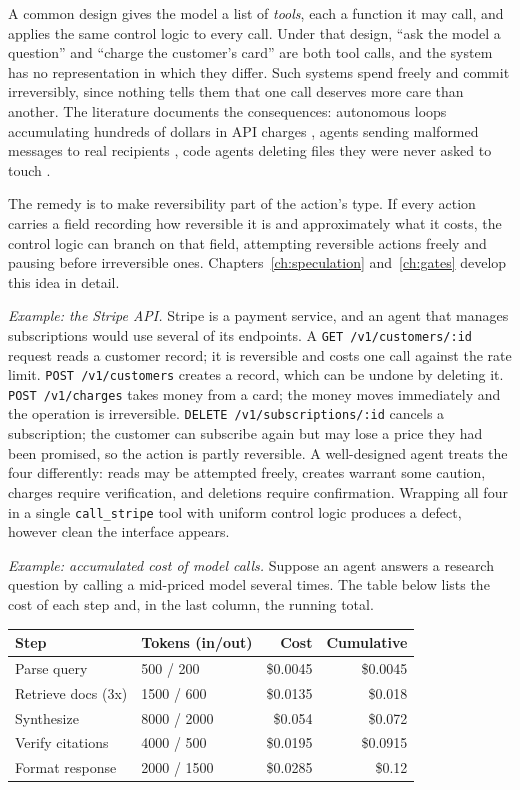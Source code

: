 \documentclass[11pt]{book}
\begin{document}
A common design gives the model a list of \textit{tools}, each a function it may call, and applies the same control logic to every call. Under that design, ``ask the model a question'' and ``charge the customer's card'' are both tool calls, and the system has no representation in which they differ. Such systems spend freely and commit irreversibly, since nothing tells them that one call deserves more care than another. The literature documents the consequences: autonomous loops accumulating hundreds of dollars in API charges \cite{yang2023autogpt}, agents sending malformed messages to real recipients \cite{liu2023agentbench}, code agents deleting files they were never asked to touch \cite{jimenez2024swebench}.

The remedy is to make reversibility part of the action's type. If every action carries a field recording how reversible it is and approximately what it costs, the control logic can branch on that field, attempting reversible actions freely and pausing before irreversible ones. Chapters~\ref{ch:speculation} and~\ref{ch:gates} develop this idea in detail.

\textit{Example: the Stripe API.} Stripe is a payment service, and an agent that manages subscriptions would use several of its endpoints. A \texttt{GET /v1/customers/:id} request reads a customer record; it is reversible and costs one call against the rate limit. \texttt{POST /v1/customers} creates a record, which can be undone by deleting it. \texttt{POST /v1/charges} takes money from a card; the money moves immediately and the operation is irreversible. \texttt{DELETE /v1/subscriptions/:id} cancels a subscription; the customer can subscribe again but may lose a price they had been promised, so the action is partly reversible. A well-designed agent treats the four differently: reads may be attempted freely, creates warrant some caution, charges require verification, and deletions require confirmation. Wrapping all four in a single \texttt{call\_stripe} tool with uniform control logic produces a defect, however clean the interface appears.

\textit{Example: accumulated cost of model calls.} Suppose an agent answers a research question by calling a mid-priced model several times. The table below lists the cost of each step and, in the last column, the running total.

\begin{center}
\begin{tabular}{llrr}
\toprule
Step & Tokens (in/out) & Cost & Cumulative \\
\midrule
Parse query & 500 / 200 & \$0.0045 & \$0.0045 \\
Retrieve docs (3x) & 1500 / 600 & \$0.0135 & \$0.018 \\
Synthesize & 8000 / 2000 & \$0.054 & \$0.072 \\
Verify citations & 4000 / 500 & \$0.0195 & \$0.0915 \\
Format response & 2000 / 1500 & \$0.0285 & \$0.12 \\
\bottomrule
\end{tabular}
\end{center}
\end{document}
